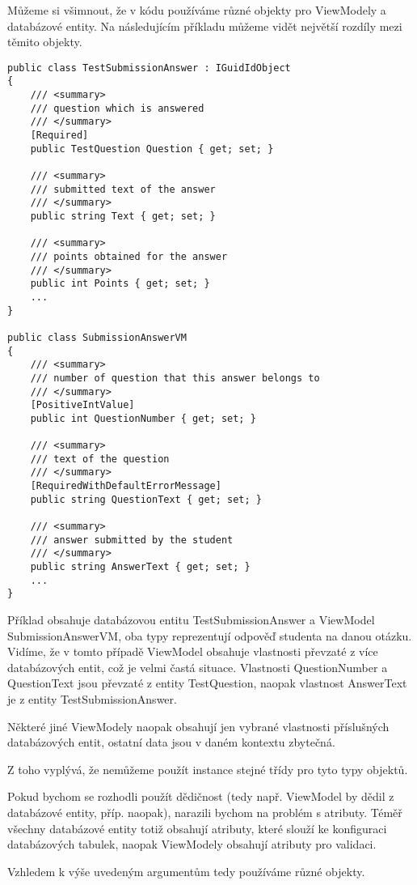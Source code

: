 Můžeme si všimnout, že v kódu používáme různé objekty pro ViewModely a databázové entity. 
Na následujícím příkladu můžeme vidět největší rozdíly mezi těmito objekty.

\lstset{style=sharpc}
\begin{lstlisting}
public class TestSubmissionAnswer : IGuidIdObject
{	
	/// <summary>
	/// question which is answered
	/// </summary>
	[Required]
	public TestQuestion Question { get; set; }
	
	/// <summary>
	/// submitted text of the answer
	/// </summary>
	public string Text { get; set; }
	
	/// <summary>
	/// points obtained for the answer
	/// </summary>
	public int Points { get; set; }
	...
}

public class SubmissionAnswerVM
{	
	/// <summary>
	/// number of question that this answer belongs to
	/// </summary>
	[PositiveIntValue]
	public int QuestionNumber { get; set; }
	
	/// <summary>
	/// text of the question
	/// </summary>
	[RequiredWithDefaultErrorMessage]
	public string QuestionText { get; set; }
	
	/// <summary>
	/// answer submitted by the student
	/// </summary>
	public string AnswerText { get; set; }
	...
}
\end{lstlisting}

Příklad obsahuje databázovou entitu TestSubmissionAnswer a ViewModel SubmissionAnswerVM, oba typy reprezentují odpověď studenta na danou otázku.
Vidíme, že v tomto případě ViewModel obsahuje vlastnosti převzaté z více databázových entit, což je velmi častá situace. Vlastnosti QuestionNumber a QuestionText jsou převzaté z entity TestQuestion, naopak vlastnost AnswerText je z entity TestSubmissionAnswer.

Některé jiné ViewModely naopak obsahují jen vybrané vlastnosti příslušných databázových entit, ostatní data jsou v daném kontextu zbytečná.

Z toho vyplývá, že nemůžeme použít instance stejné třídy pro tyto typy objektů.

Pokud bychom se rozhodli použít dědičnost (tedy např. ViewModel by dědil z databázové entity, příp. naopak), narazili bychom na problém s atributy.
Téměř všechny databázové entity totiž obsahují atributy, které slouží ke konfiguraci databázových tabulek, naopak ViewModely obsahují atributy pro validaci. 

Vzhledem k výše uvedeným argumentům tedy používáme různé objekty.



